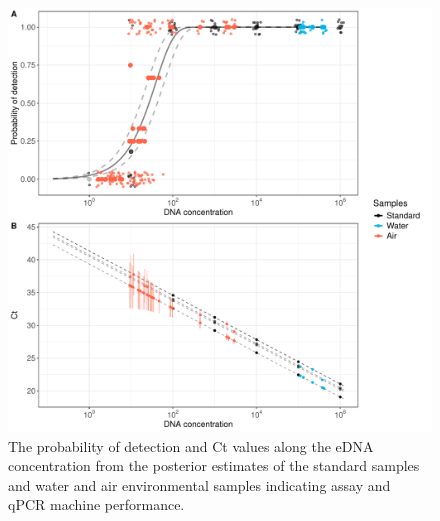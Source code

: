 \documentclass{article}
\begin{document}
\clearpage
\begin{figure}[tbhp] 
\centering
\includegraphics[width=12.0cm]{../../Plots/Supplementary Figure 6.pdf}  
\caption{The probability of detection and Ct values along the eDNA concentration from the posterior estimates of the standard samples and water and air environmental samples indicating assay and qPCR machine performance.}
\label{fig:qpcr}
\end{figure}
\end{document}
